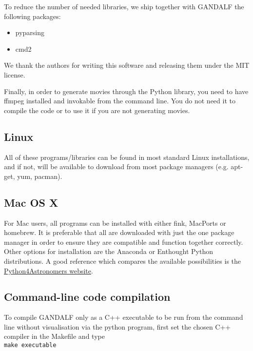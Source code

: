 \documentclass[a4paper]{article}
\newcommand{\var}[1]{\texttt{#1}}
\begin{document}
To reduce the number of needed libraries, we ship together with GANDALF the following packages:
\begin{itemize}
\item pyparsing
\item cmd2
\end{itemize}
We thank the authors for writing this software and releasing them under the MIT license.

Finally, in order to generate movies through the Python library, you need to have ffmpeg installed and invokable from the command line. You do not need it to compile the code or to use it if you are not generating movies.

\subsection{Linux}
All of these programs/libraries can be found in most standard Linux installations, and if not, will be available to download from most package managers (e.g. apt-get, yum, pacman).

\subsection{Mac OS X}
For Mac users, all programs can be installed with either fink, MacPorts or homebrew.  It is preferable that all are downloaded with just the one package manager in order to ensure they are compatible and function together correctly. Other options for installation are the Anaconda or Enthought Python distributions. A good reference which compares the available possibilities is the \href{http://python4astronomers.github.io/installation/recommended_options.html}{Python4Astronomers website}.



\subsection{Command-line code compilation}

To compile GANDALF only as a C++ executable to be run from the command line without visualisation via the python program, first set the chosen C++ compiler in the Makefile and type \\
\newline
\noindent \var{make executable} \\
\end{document}
